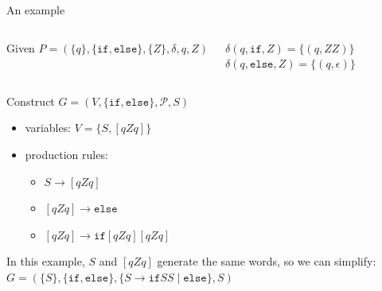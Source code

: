 \documentclass[handout]{beamer}
\begin{document}
\begin{frame}{An example}

    \begin{columns}

        \centering
        
        Given $P=(\{q\},\{\mathtt{if},\mathtt{else}\},\{Z\},\delta,q,Z)$
        
        \smallskip

        $\delta(q,\mathtt{if},Z)=\{(q,ZZ)\}$\\        
        $\delta(q,\mathtt{else},Z)=\{(q,\epsilon)\}$
        

        \begin{center}
        \end{center} 

    \end{columns}

    Construct $G=(V,\{\mathtt{if},\mathtt{else}\},\mathcal P,S)$

    \begin{itemize}
        \item variables: $V=\{S,[qZq]\}$ 
        \item production rules:
        \begin{itemize}
            \item $S\rightarrow [qZq]$            
            \item $[qZq]\rightarrow \mathtt{else}$
            \item $[qZq]\rightarrow \mathtt{if}[qZq][qZq]$
            
        \end{itemize}        
    \end{itemize}    
    
    In this example, $S$ and $[qZq]$ generate the same words, so we can simplify:
         $G=(\{S\},\{\mathtt{if},\mathtt{else}\},\{S\rightarrow \mathtt{if}SS\mid\mathtt{else}\},S)$
    
\end{frame}
\end{document}

